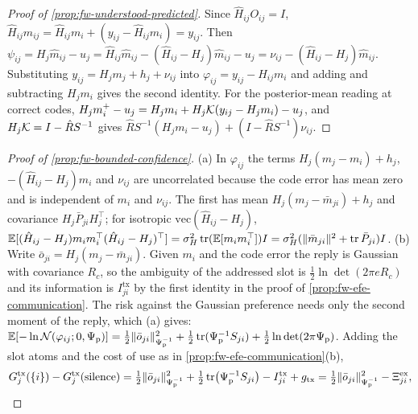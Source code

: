 \begin{proof}[Proof of \cref{prop:fw-understood-predicted}]
Since $\hat H_{ij}O_{ij}=I$, $\hat H_{ij}\hat m_{ij}=\hat H_{ij}m_i+(y_{ij}-\hat H_{ij}m_i)=y_{ij}$. Then $\psi_{ij}=H_j\hat m_{ij}-u_j=\hat H_{ij}\hat m_{ij}-(\hat H_{ij}-H_j)\hat m_{ij}-u_j=\nu_{ij}-(\hat H_{ij}-H_j)\hat m_{ij}$. Substituting $y_{ij}=H_jm_j+h_j+\nu_{ij}$ into $\varphi_{ij}=y_{ij}-\hat H_{ij}m_i$ and adding and subtracting $H_jm_i$ gives the second identity. For the posterior-mean reading at correct codes, $H_jm_i^+-u_j=H_jm_i+H_j\mathcal{K}(y_{ij}-H_jm_i)-u_j$, and $H_j\mathcal{K}=I-\hat RS^{-1}$ gives $\hat RS^{-1}(H_jm_i-u_j)+(I-\hat RS^{-1})\nu_{ij}$.
\end{proof}

\begin{proof}[Proof of \cref{prop:fw-bounded-confidence}]
(a) In $\varphi_{ij}$ the terms $H_j(m_j-m_i)+h_j$, $-(\hat H_{ij}-H_j)m_i$ and $\nu_{ij}$ are uncorrelated because the code error has mean zero and is independent of $m_i$ and $\nu_{ij}$. The first has mean $H_j(m_j-\bar m_{ji})+h_j$ and covariance $H_j\bar P_{ji}H_j^\top$; for isotropic $\mathrm{vec}(\hat H_{ij}-H_j)$, $\mathbb{E}[(\hat H_{ij}-H_j)m_im_i^\top(\hat H_{ij}-H_j)^\top]=\sigma_H^2\operatorname{tr}(\mathbb{E}[m_im_i^\top])I=\sigma_H^2(\Vert\bar m_{ji}\Vert^2+\operatorname{tr}\bar P_{ji})I$. (b) Write $\bar o_{ji}=H_j(m_j-\bar m_{ji})$. Given $m_i$ and the code error the reply is Gaussian with covariance $R_c$, so the ambiguity of the addressed slot is $\tfrac12\ln\det(2\pi eR_c)$ and its information is $I^{\mathrm{tx}}_{ji}$ by the first identity in the proof of \cref{prop:fw-efe-communication}. The risk against the Gaussian preference needs only the second moment of the reply, which (a) gives: $\mathbb{E}[-\ln\mathcal{N}(\varphi_{ij};0,\Psi_{\mathrm p})]=\tfrac12\Vert\bar o_{ji}\Vert^2_{\Psi_{\mathrm p}^{-1}}+\tfrac12\operatorname{tr}(\Psi_{\mathrm p}^{-1}S_{ji})+\tfrac12\ln\det(2\pi\Psi_{\mathrm p})$. Adding the slot atoms and the cost of use as in \cref{prop:fw-efe-communication}(b),
\[
G^{\mathrm{tx}}_j(\{i\})-G^{\mathrm{tx}}_j(\text{silence})=\tfrac12\Vert\bar o_{ji}\Vert^2_{\Psi_{\mathrm p}^{-1}}+\tfrac12\operatorname{tr}\bigl(\Psi_{\mathrm p}^{-1}S_{ji}\bigr)-I^{\mathrm{tx}}_{ji}+g_{\mathrm{tx}}=\tfrac12\Vert\bar o_{ji}\Vert^2_{\Psi_{\mathrm p}^{-1}}-\Xi^{\mathrm{ex}}_{ji},
\]

\end{proof}
